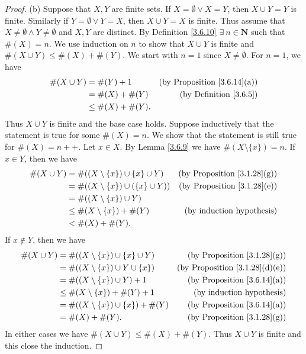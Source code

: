\begin{proof}{(b)}
    Suppose that \(X, Y\) are finite sets.
    If \(X = \emptyset \lor X = Y\), then \(X \cup Y = Y\) is finite.
    Similarly if \(Y = \emptyset \lor Y = X\), then \(X \cup Y = X\) is finite.
    Thus assume that \(X \neq \emptyset \land Y \neq \emptyset\) and \(X, Y\) are distinct.
    By Definition \ref{3.6.10} \(\exists\ n \in \mathbf{N}\) such that \(\#(X) = n\).
    We use induction on \(n\) to show that \(X \cup Y\) is finite and \(\#(X \cup Y) \leq \#(X) + \#(Y)\).
    We start with \(n = 1\) since \(X \neq \emptyset\).
    For \(n = 1\), we have
    \begin{align*}
        \#(X \cup Y) & = \#(Y) + 1         & \text{(by Proposition \ref{3.6.14}(a))} \\
                     & = \#(X) + \#(Y)     & \text{(by Definition \ref{3.6.5})}      \\
                     & \leq \#(X) + \#(Y).
    \end{align*}
    Thus \(X \cup Y\) is finite and the base case holds.
    Suppose inductively that the statement is true for some \(\#(X) = n\).
    We show that the statement is still true for \(\#(X) = n++\).
    Let \(x \in X\).
    By Lemma \ref{3.6.9} we have \(\#(X \setminus \{x\}) = n\).
    If \(x \in Y\), then we have
    \begin{align*}
        \#(X \cup Y) & = \#((X \setminus \{x\}) \cup \{x\} \cup Y)   & \text{(by Proposition \ref{3.1.28}(g))} \\
                     & = \#((X \setminus \{x\}) \cup (\{x\} \cup Y)) & \text{(by Proposition \ref{3.1.28}(e))} \\
                     & = \#((X \setminus \{x\}) \cup Y)                                                        \\
                     & \leq \#(X \setminus \{x\}) + \#(Y)            & \text{(by induction hypothesis)}        \\
                     & < \#(X) + \#(Y).
    \end{align*}
    If \(x \notin Y\), then we have
    \begin{align*}
        \#(X \cup Y) & = \#((X \setminus \{x\}) \cup \{x\} \cup Y)  & \text{(by Proposition \ref{3.1.28}(g))}    \\
                     & = \#((X \setminus \{x\}) \cup Y \cup \{x\})  & \text{(by Proposition \ref{3.1.28}(d)(e))} \\
                     & = \#((X \setminus \{x\}) \cup Y) + 1         & \text{(by Proposition \ref{3.6.14}(a))}    \\
                     & \leq \#(X \setminus \{x\}) + \#(Y) + 1       & \text{(by induction hypothesis)}           \\
                     & = \#((X \setminus \{x\}) \cup \{x\}) + \#(Y) & \text{(by Proposition \ref{3.6.14}(a))}    \\
                     & = \#(X) + \#(Y).                             & \text{(by Proposition \ref{3.1.28}(g))}
    \end{align*}
    In either cases we have \(\#(X \cup Y) \leq \#(X) + \#(Y)\).
    Thus \(X \cup Y\) is finite and this close the induction.


\end{proof}
